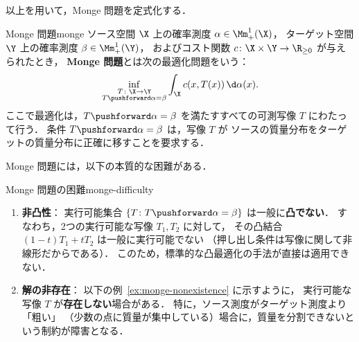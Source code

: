 以上を用いて，Monge 問題を定式化する．

\begin{setting}{Monge 問題}{monge}
  ソース空間 $\X$ 上の確率測度 $\alpha \in \Mm_+^1(\X)$，
  ターゲット空間 $\Y$ 上の確率測度 $\beta \in \Mm_+^1(\Y)$，
  およびコスト関数 $c \colon \X \times \Y \to \R_{\geq 0}$ が与えられたとき，
  \textbf{Monge 問題}とは次の最適化問題をいう：
  \[
    \inf_{\substack{T \colon \X \to \Y \\ T\pushforward \alpha = \beta}}
    \int_{\X} c(x, T(x)) \, \d\alpha(x).
  \]
  ここで最適化は，$T\pushforward \alpha = \beta$ を満たすすべての可測写像 $T$ にわたって行う．
  条件 $T\pushforward \alpha = \beta$ は，写像 $T$ が
  ソースの質量分布をターゲットの質量分布に正確に移すことを要求する．
\end{setting}

Monge 問題には，以下の本質的な困難がある．

\begin{remark}{Monge 問題の困難}{monge-difficulty}
  \begin{enumerate}
    \item \textbf{非凸性}：
      実行可能集合 $\{T \colon T\pushforward \alpha = \beta\}$ は一般に\textbf{凸でない}．
      すなわち，2つの実行可能な写像 $T_1, T_2$ に対して，
      その凸結合 $(1-t)T_1 + tT_2$ は一般に実行可能でない
      （押し出し条件は写像に関して非線形だからである）．
      このため，標準的な凸最適化の手法が直接は適用できない．

    \item \textbf{解の非存在}：
      以下の例~\ref{ex:monge-nonexistence} に示すように，
      実行可能な写像 $T$ が\textbf{存在しない}場合がある．
      特に，ソース測度がターゲット測度より「粗い」
      （少数の点に質量が集中している）場合に，質量を分割できないという制約が障害となる．
  \end{enumerate}
\end{remark}

